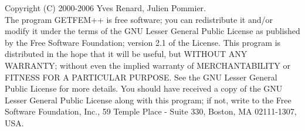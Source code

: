 Copyright (C) 2000-2006 Yves Renard, Julien Pommier.\\
The program GETFEM++ is free software; you can redistribute it and/or modify
it under the terms of the GNU Lesser General Public License as published by
the Free Software Foundation; version 2.1 of the License.
This program is distributed in the hope that it will be useful,
but WITHOUT ANY WARRANTY; without even the implied warranty of
MERCHANTABILITY or FITNESS FOR A PARTICULAR PURPOSE.  See the
GNU Lesser General Public License for more details.
You should have received a copy of the GNU  Lesser General Public License
along with this program; if not, write to the Free Software Foundation,
Inc., 59 Temple Place - Suite 330, Boston, MA  02111-1307, USA.
